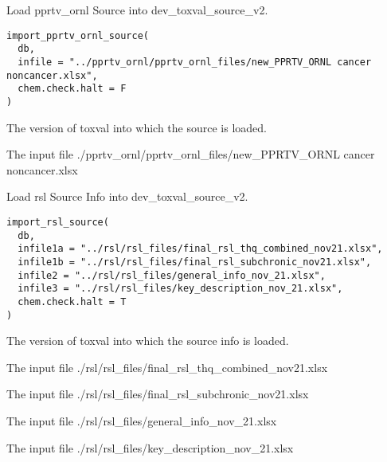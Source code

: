 \documentclass[letterpaper]{book}
\begin{document}
%
\begin{Description}\relax
Load pprtv\_ornl Source into dev\_toxval\_source\_v2.
\end{Description}
%
\begin{Usage}
\begin{verbatim}
import_pprtv_ornl_source(
  db,
  infile = "../pprtv_ornl/pprtv_ornl_files/new_PPRTV_ORNL cancer noncancer.xlsx",
  chem.check.halt = F
)
\end{verbatim}
\end{Usage}
%
\begin{Arguments}
\begin{ldescription}
\item[\code{db}] The version of toxval into which the source is loaded.

\item[\code{infile}] The input file ./pprtv\_ornl/pprtv\_ornl\_files/new\_PPRTV\_ORNL cancer noncancer.xlsx
\end{ldescription}
\end{Arguments}
%
\begin{Description}\relax
Load rsl Source Info into dev\_toxval\_source\_v2.
\end{Description}
%
\begin{Usage}
\begin{verbatim}
import_rsl_source(
  db,
  infile1a = "../rsl/rsl_files/final_rsl_thq_combined_nov21.xlsx",
  infile1b = "../rsl/rsl_files/final_rsl_subchronic_nov21.xlsx",
  infile2 = "../rsl/rsl_files/general_info_nov_21.xlsx",
  infile3 = "../rsl/rsl_files/key_description_nov_21.xlsx",
  chem.check.halt = T
)
\end{verbatim}
\end{Usage}
%
\begin{Arguments}
\begin{ldescription}
\item[\code{db}] The version of toxval into which the source info is loaded.

\item[\code{infile1a}] The input file ./rsl/rsl\_files/final\_rsl\_thq\_combined\_nov21.xlsx

\item[\code{infile1b}] The input file ./rsl/rsl\_files/final\_rsl\_subchronic\_nov21.xlsx

\item[\code{infile2}] The input file ./rsl/rsl\_files/general\_info\_nov\_21.xlsx

\item[\code{infile3}] The input file ./rsl/rsl\_files/key\_description\_nov\_21.xlsx
\end{ldescription}
\end{Arguments}
\end{document}

